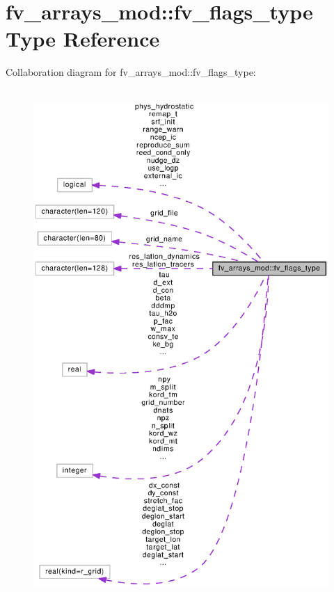 \section{fv\-\_\-arrays\-\_\-mod\-:\-:fv\-\_\-flags\-\_\-type Type Reference}
\label{structfv__arrays__mod_1_1fv__flags__type}


Collaboration diagram for fv\-\_\-arrays\-\_\-mod\-:\-:fv\-\_\-flags\-\_\-type\-:
\nopagebreak
\begin{figure}[H]
\begin{center}
\leavevmode
\includegraphics[height=550pt]{structfv__arrays__mod_1_1fv__flags__type__coll__graph}
\end{center}
\end{figure}
